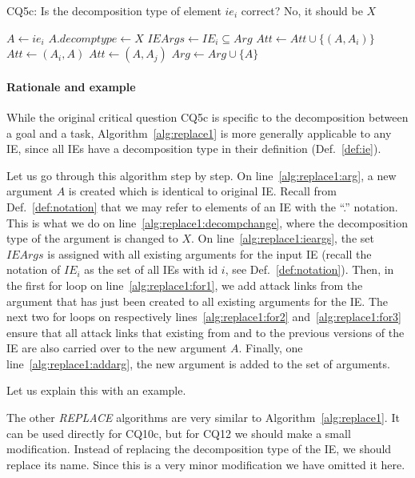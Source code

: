 \begin{algorithm}[h]
  \caption{CQ5c: Is the decomposition type of element $ie_i$ correct? No, it should be $X$ }\label{alg:replace1}
  \begin{algorithmic}[1]
    \State $A \leftarrow ie_i$\label{alg:replace1:arg}
    \State $A.decomptype\leftarrow X$\label{alg:replace1:decompchange}
    \State $IEArgs\leftarrow IE_i\subseteq  Arg$\label{alg:replace1:ieargs}
    \label{alg:replace1:for1}
      \State $Att \leftarrow Att \cup \{(A,A_i)\}$\label{alg:replace1:att}
    \EndFor
    \label{alg:replace1:for2}
      \State $Att\leftarrow (A_i,A)$
    \EndFor
    \label{alg:replace1:for3}
      \State $Att\leftarrow (A,A_j)$
    \EndFor
    \State $Arg\leftarrow Arg \cup \{A\}$\label{alg:replace1:addarg}
    \EndProcedure
  \end{algorithmic}
\end{algorithm}

\paragraph{Rationale and example} While the original critical question CQ5c is specific to the decomposition between a goal and a task, Algorithm~\ref{alg:replace1} is more generally applicable to any IE, since all IEs have a decomposition type in their definition (Def.~\ref{def:ie}). 

Let us go through this algorithm step by step. On line~\ref{alg:replace1:arg}, a new argument $A$ is created which is identical to original IE. Recall from Def.~\ref{def:notation} that we may refer to elements of an IE with the ``.'' notation. This is what we do on line~\ref{alg:replace1:decompchange}, where the decomposition type of the argument is changed to $X$. On line~\ref{alg:replace1:ieargs}, the set $IEArgs$ is assigned with all existing arguments for the input IE (recall the notation of $IE_i$ as the set of all IEs with id $i$, see Def.~\ref{def:notation}). Then, in the first for loop on line~\ref{alg:replace1:for1}, we add attack links from the argument that has just been created to all existing arguments for the IE. The next two for loops on respectively lines~\ref{alg:replace1:for2} and~\ref{alg:replace1:for3} ensure that all attack links that existing from and to the previous versions of the IE are also carried over to the new argument $A$. Finally, one line~\ref{alg:replace1:addarg}, the new argument is added to the set of arguments.

Let us explain this with an example. 

The other \emph{REPLACE} algorithms are very similar to Algorithm~\ref{alg:replace1}. It can be used directly for CQ10c, but for CQ12 we should make a small modification. Instead of replacing the decomposition type of the IE, we should replace its name. Since this is a very minor modification we have omitted it here.
